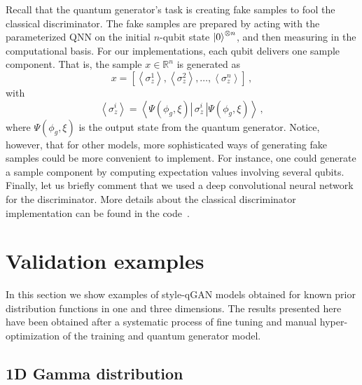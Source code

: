\documentclass[twocolumn,preprintnumbers,superscriptaddress]{revtex4-2}
\begin{document}
Recall that the quantum generator's task is creating fake samples to fool the classical discriminator. The fake samples are prepared by acting with the parameterized QNN on the initial $n$-qubit state $\ket{0}^{\otimes n}$, and then measuring in the computational basis. For our implementations, each qubit delivers one sample component. That is, the sample $x \in \mathbb{R}^n$ is generated as
\begin{equation}
    \label{eq:samples} x = \left[\left\langle\sigma_z^1\right\rangle,\left\langle\sigma_z^2\right\rangle,\hdots,\left\langle\sigma_z^n\right\rangle\right]\,,
\end{equation}
with
\begin{equation}
    \label{eq:expectation}\left\langle\sigma_z^i\right\rangle = \left\langle\Psi(\phi_g,\xi)\left|\,\sigma_z^i\,\right|\Psi(\phi_g,\xi)\right\rangle \,,
\end{equation}
where $\Psi(\phi_g,\xi)$ is the output state from the quantum generator. Notice, however, that for other models, more sophisticated ways of generating fake samples could be more convenient to implement. For instance, one could generate a sample component by computing expectation values involving several qubits. Finally, let us briefly comment that we used a deep convolutional neural network for the discriminator. More details about the classical discriminator implementation can be found in the code~\cite{cite_code}.

\section{Validation examples}
\label{sec:validation}

In this section we show examples of style-qGAN models obtained for known prior
distribution functions in one and three dimensions. The results presented here
have been obtained after a systematic process of fine tuning and manual
hyper-optimization of the training and quantum generator model.

\subsection{1D Gamma distribution}
\label{sec:gamma}
\end{document}
